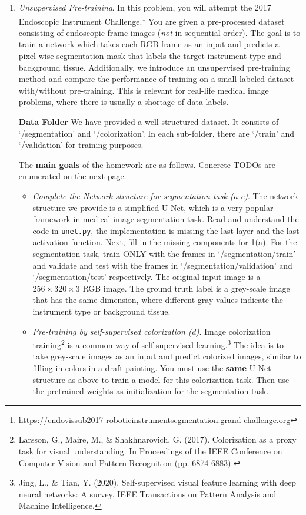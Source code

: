 \documentclass[a4paper]{article}
\begin{document}
	\begin{enumerate}
		\item \textit{Unsupervised Pre-training}. In this problem, you will attempt the 2017 Endoscopic Instrument Challenge.\footnote{\url{https://endovissub2017-roboticinstrumentsegmentation.grand-challenge.org}} You are given a pre-processed dataset consisting of endoscopic frame images (\emph{not} in sequential order). The goal is to train a network which takes each RGB frame as an input and predicts a pixel-wise segmentation mask that labels the target instrument type and background tissue. Additionally, we introduce an unsupervised pre-training method and compare the performance of training on a small labeled dataset with/without pre-training. This is relevant for real-life medical image problems, where there is usually a shortage of data labels. 
		
		\textbf{Data Folder} 
		We have provided a well-structured dataset. It consists of `/segmentation' and `/colorization'. In each sub-folder, there are `/train' and `/validation' for training purposes. 
		
		The \textbf{main goals} of the homework are as follows. Concrete TODOs are enumerated on the next page.
		
		\begin{itemize}
			\item \textit{Complete the Network structure for segmentation task (a-c)}. The network structure we provide is a simplified U-Net, which is a very popular framework in medical image segmentation task.  Read and understand the code in \texttt{unet.py}, the implementation is missing the last layer and the last activation function. Next, fill in the missing components for 1(a). For the segmentation task, train ONLY with the frames in `/segmentation/train' and validate and test with the frames in `/segmentation/validation' and `/segmentation/test' respectively. The original input image is a $256 \times 320 \times 3$ RGB image. The ground truth label is a grey-scale image that has the same dimension, where different gray values indicate the instrument type or background tissue. 
			
			
			\item \textit{Pre-training by self-supervised colorization (d)}.  Image colorization training\footnote{Larsson, G., Maire, M., \& Shakhnarovich, G. (2017). Colorization as a proxy task for visual understanding. In Proceedings of the IEEE Conference on Computer Vision and Pattern Recognition (pp. 6874-6883).} is a common way of self-supervised learning.\footnote{Jing, L., \& Tian, Y. (2020). Self-supervised visual feature learning with deep neural networks: A survey. IEEE Transactions on Pattern Analysis and Machine Intelligence.} The idea is to take grey-scale images as an input and predict colorized images, similar to filling in colors in a draft painting. You must use the \textbf{same} U-Net structure as above to train a model for this colorization task. Then use the pretrained weights as initialization for the segmentation task.
			

\end{itemize}
\end{enumerate}
\end{document}
